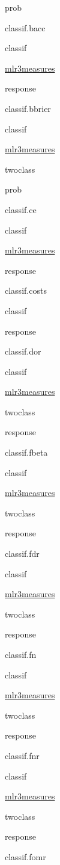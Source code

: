 \documentclass[]{article}
\begin{document}
prob

classif.bacc

classif

\href{https://cran.r-project.org/package=mlr3measures}{mlr3measures}

response

classif.bbrier

classif

\href{https://cran.r-project.org/package=mlr3measures}{mlr3measures}

twoclass

prob

classif.ce

classif

\href{https://cran.r-project.org/package=mlr3measures}{mlr3measures}

response

classif.costs

classif

response

classif.dor

classif

\href{https://cran.r-project.org/package=mlr3measures}{mlr3measures}

twoclass

response

classif.fbeta

classif

\href{https://cran.r-project.org/package=mlr3measures}{mlr3measures}

twoclass

response

classif.fdr

classif

\href{https://cran.r-project.org/package=mlr3measures}{mlr3measures}

twoclass

response

classif.fn

classif

\href{https://cran.r-project.org/package=mlr3measures}{mlr3measures}

twoclass

response

classif.fnr

classif

\href{https://cran.r-project.org/package=mlr3measures}{mlr3measures}

twoclass

response

classif.fomr
\end{document}
